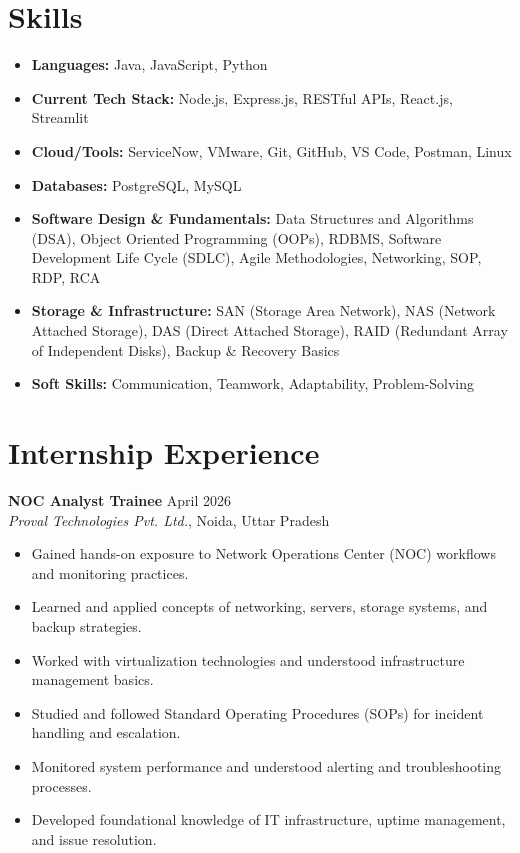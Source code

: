 \documentclass[10pt,letterpaper]{article}
\begin{document}
\section{Skills}
\begin{itemize}[leftmargin=0.15in, label={}, itemsep=0.1pt, parsep=2pt]
    \item \textbf{Languages:} Java, JavaScript, Python
    \item \textbf{Current Tech Stack:} Node.js, Express.js, RESTful APIs, React.js, Streamlit
    \item \textbf{Cloud/Tools:} ServiceNow, VMware, Git, GitHub, VS Code, Postman, Linux
    \item \textbf{Databases:} PostgreSQL, MySQL
    \item \textbf{Software Design \& Fundamentals:} Data Structures and Algorithms (DSA), Object Oriented Programming (OOPs), RDBMS, Software Development Life Cycle (SDLC), Agile Methodologies, Networking, SOP, RDP, RCA
    \item \textbf{Storage \& Infrastructure:} SAN (Storage Area Network), NAS (Network Attached Storage), DAS (Direct Attached Storage), RAID (Redundant Array of Independent Disks), Backup \& Recovery Basics
    \item \textbf{Soft Skills:} Communication, Teamwork, Adaptability, Problem-Solving
\end{itemize}

\section{Internship Experience}
\noindent
\textbf{NOC Analyst Trainee} \hfill April 2026 \\
\textit{Proval Technologies Pvt. Ltd.}, Noida, Uttar Pradesh
\begin{itemize}[leftmargin=0.2in, nosep, topsep=2pt]
    \item Gained hands-on exposure to Network Operations Center (NOC) workflows and monitoring practices.
    \item Learned and applied concepts of networking, servers, storage systems, and backup strategies.
    \item Worked with virtualization technologies and understood infrastructure management basics.
    \item Studied and followed Standard Operating Procedures (SOPs) for incident handling and escalation.
    \item Monitored system performance and understood alerting and troubleshooting processes.
    \item Developed foundational knowledge of IT infrastructure, uptime management, and issue resolution.
\end{itemize}
\end{document}
